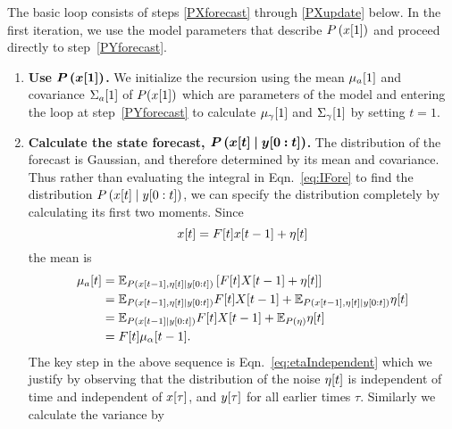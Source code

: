 The basic loop consists of steps \ref{PXforecast} through
\ref{PXupdate} below.  In the first iteration, we use the model
parameters that describe $P\left({x}{[1]} \right)$ and proceed
directly to step~\ref{PYforecast}.
\begin{enumerate}
\item \label{PX1} \textbf{Use $\bm{P\left({x}{[1]} \right)}$.}  We
  initialize the recursion using the mean ${\mu_a}{[1]}$ and
  covariance ${\Sigma_a}{[1]}$ of $P({x}{[1]})$ which are parameters
  of the model and entering the loop at step~\ref{PYforecast} to
  calculate ${\mu_\gamma}{[1]}$ and ${\Sigma_\gamma}{[1]}$ by
  setting $t=1$.
\item \label{PXforecast} \textbf{Calculate the state forecast,
    $\bm{P\left({x}{[t]}\mid y[0:t] \right)}$.}  The distribution
  of the forecast is Gaussian, and therefore determined by its mean
  and covariance.  Thus rather than evaluating the integral in
  Eqn.~\eqref{eq:IFore} to find the distribution
  $P\left({x}{[t]}\mid y[0:t] \right)$, we can specify the
  distribution completely by calculating its first two moments.  Since
  \begin{equation*}
    {x}{[t]} = {F}{[t]} {x}{[t-1]} + {\eta}{[t]}
  \end{equation*}
  the mean is
  \begin{align}
    {\mu_a}{[t]} &= \mathbb{E}_{P
      \left({x}{[t-1]},{\eta}{[t]}\mid y[0:t] \right)} \left[
      {F}{[t]}{X}{[t-1]} + {\eta}{[t]} \right] \nonumber \\
    &= \mathbb{E}_{P\left({x}{[t-1]},{\eta}{[t]}\mid y[0:t] \right)}
      {F}{[t]}{X}{[t-1]} +
      \mathbb{E}_{P\left({x}{[t-1]},{\eta}{[t]}\mid y[0:t] \right)} {\eta}{[t]} \nonumber \\
    \label{eq:etaIndependent}
    &= \mathbb{E}_{P \left({x}{[t-1]}\mid y[0:t] \right)}
    {F}{[t]}{X}{[t-1]}  + \mathbb{E}_{P (\eta)} {\eta}{[t]} \\
     &= {F}{[t]}{\mu_\alpha}{[t-1]}. \nonumber
   \end{align}
   The key step in the above sequence is
   Eqn.~\eqref{eq:etaIndependent} which we justify by observing that
   the distribution of the noise ${\eta}{[t]}$ is independent of time
   and independent of ${x}{[\tau]}$, and ${y}{[\tau]}$ for all
   earlier times $\tau$.  Similarly we calculate the
   variance by
   \begin{align}

\end{align}
\end{enumerate}
